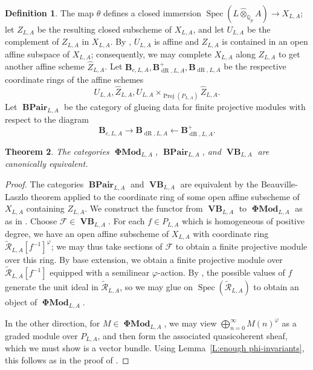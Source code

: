 \documentclass[12pt]{amsart}
\newtheorem{theorem}{Theorem}[section]
\theoremstyle{definition}
\newtheorem{defn}[theorem]{Definition}
\numberwithin{equation}{theorem}
\newcommand{\bB}{\mathbf{B}}
\newcommand{\QQ}{\mathbb{Q}}
\newcommand{\calF}{\mathcal{F}}
\newcommand{\calR}{\mathcal{R}}
\DeclareMathOperator{\BPair}{\mathbf{BPair}}
\DeclareMathOperator{\dR}{dR}
\DeclareMathOperator{\PhiMod}{\mathbf{\Phi Mod}}
\DeclareMathOperator{\Proj}{Proj}
\DeclareMathOperator{\Spec}{Spec}
\DeclareMathOperator{\VB}{\mathbf{VB}}
\begin{document}
\begin{defn} \label{D:B-pairs}
The map $\theta$ defines a closed immersion $\Spec(L \widehat{\otimes}_{\QQ_p} A) \to X_{L,A}$; let $Z_{L,A}$ be the resulting closed subscheme of $X_{L,A}$, and let $U_{L,A}$ be the complement of $Z_{L,A}$ in $X_{L,A}$.
By \cite[Lemma~8.9.3]{kedlaya-liu1}, $U_{L,A}$ is affine and $Z_{L,A}$ is contained in an open affine subspace of $X_{L,A}$; consequently, we may complete $X_{L,A}$ along $Z_{L,A}$ to get another affine scheme $\widehat{Z}_{L,A}$. Let $\bB_{e,L,A}, \bB^+_{\dR,L,A}, \bB_{\dR,L,A}$ be the respective coordinate rings of the affine schemes 
\[
U_{L,A}, \widehat{Z}_{L,A}, U_{L,A} \times_{\Proj(P_{L,A})} \widehat{Z}_{L,A}.
\]
Let $\BPair_{L,A}$ be the category of glueing data for finite projective modules with respect to the diagram
\[
\bB_{e,L,A} \rightarrow \bB_{\dR,L,A} \leftarrow \bB_{\dR,L,A}^+.
\]
\end{defn}

\begin{theorem} \label{T:perfect equivalence}
The categories $\PhiMod_{L,A}$, $\BPair_{L,A}$, and $\VB_{L,A}$ are canonically equivalent.
\end{theorem}
\begin{proof}
The categories $\BPair_{L,A}$ and $\VB_{L,A}$ are equivalent by the Beauville-Laszlo theorem
\cite{beauville-laszlo} applied to the coordinate ring of some open affine subscheme of $X_{L,A}$ containing $Z_{L,A}$.
We construct the functor from $\VB_{L,A}$ to $\PhiMod_{L,A}$ as 
as in \cite[Definition~6.3.10]{kedlaya-liu1}.
Choose $\calF \in \VB_{L,A}$.
For each $f \in P_{L,A}$ which is homogeneous of positive degree,
we have an open affine subscheme of $X_{L,A}$ with coordinate ring $\tilde{\calR}_{L,A}[f^{-1}]^\varphi$; we may thus take sections of $\calF$ to obtain a finite projective module over  this ring. By base extension, we obtain a finite projective module over $\tilde{\calR}_{L,A}[f^{-1}]$ equipped with a semilinear $\varphi$-action. By \cite[Lemma~6.3.7]{kedlaya-liu1}, the possible values of $f$ generate the unit ideal in $\tilde{\calR}_{L,A}$, so we may glue on $\Spec(\tilde{\calR}_{L,A})$ to obtain an object of $\PhiMod_{L,A}$.

In the other direction, for $M \in \PhiMod_{L,A}$, we may view
$\bigoplus_{n=0}^\infty M(n)^{\varphi}$ as a graded module over $P_{L,A}$, and then form the associated quasicoherent sheaf, which we must show is a vector bundle.
Using Lemma~\ref{L:enough phi-invariants}, this follows as in the proof of \cite[Theorem~6.3.12]{kedlaya-liu1}.
\end{proof}
\end{document}
